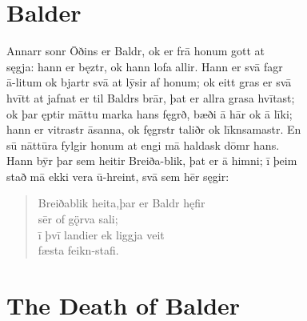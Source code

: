 \documentclass[12pt,letterpaper]{book}
\newcommand{\gap}[1][.25in]{\hspace{#1}}
\newcommand\emptypage{\clearpage{\pagestyle{empty}\cleardoublepage}}
\begin{document}
\emptypage

\chapter{Balder}

\resetlinenumber
\begin{linenumbers}

Annarr sonr Ōðins er Baldr, ok er frā honum gott at\\
sęgja: hann er bęztr, ok hann lofa allir.  Hann er svā fagr\\
ā-litum ok bjartr svā at lȳsir af honum; ok eitt gras er svā\\
hvītt at jafnat er til Baldrs brār, þat er allra grasa hvītast;\\
ok þar ęptir māttu marka hans fęgrð, bæði ā hār ok ā līki;\\
hann er vitrastr āsanna, ok fęgrstr taliðr ok līknsamastr.  En\\
sū nāttūra fylgir honum at engi mā haldask dōmr hans.\\
Hann bȳr þar sem heitir Breiða-blik, þat er ā himni; ī þeim\\
stað mā ekki vera ū-hreint, svā sem hēr sęgir:

\begin{verse}
	Breiðablik heita,\gap þar er Baldr hęfir\\
	\gap sēr of gǫ̈rva sali;\\
	ī þvī landi\gap er ek liggja veit\\
	\gap fæsta feikn-stafi.
\end{verse}

\end{linenumbers}

\emptypage

\chapter{The Death of Balder}
\end{document}
